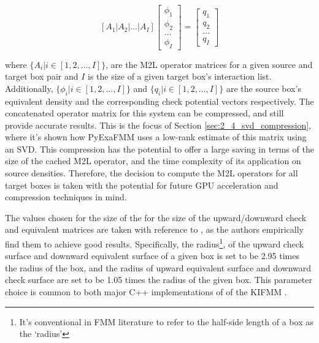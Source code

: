 \begin{equation}
    \left [ A_1 | A_2 | ... | A_I \right] \begin{bmatrix} \phi_1 \\ \phi_2 \\  ... \\  \phi_I \end{bmatrix} = \begin{bmatrix} q_1\\ q_2\\  ... \\  q_I \end{bmatrix}
    \label{eq:2_3_concatenated_m2l}
\end{equation}

where $\{A_i | i \in [1, 2, ..., I]\}$, are the M2L operator matrices for a given
source and target box pair and $I$ is the size of a given
target box's interaction list. Additionally, $\{\phi_i | i \in [1,2, ..., I]\}$ and $\{q_i | i \in [1,2, ..., I]\}$
are the source box's equivalent density and the corresponding check potential vectors
respectively. The concatenated operator matrix for this system can be compressed, and still
provide accurate results. This is the focus of Section \ref{sec:2_4_svd_compression},
where it's shown how \gls{PyExaFMM} uses a low-rank estimate of this matrix using
an \gls{SVD}. This compression has the potential to offer a large saving in terms
of the size of the cached M2L operator, and the time complexity of its application
on source densities. Therefore, the decision to compute the \gls{M2L} operators for
all target boxes is taken with the potential for future GPU acceleration and
compression techniques in mind.

The values chosen for the size of the for the size of the upward/downward
check and equivalent matrices are taken with reference to \cite{Malhotra:2015:CCP},
as the authors empirically find them to achieve good results. Specifically,
the radius\footnote{It's conventional in FMM literature to refer to the half-side
length of a box as the `radius'}, of the upward check surface and downward equivalent
surface of a given box is set to be 2.95 times the radius of the box, and the radius of
upward equivalent surface and downward check surface are set to be 1.05 times the radius
of the given box. This parameter choice is common to both major C++ implementations of
of the \gls{KIFMM} \cite{exafmm,Malhotra:2015:CCP}.

